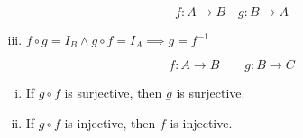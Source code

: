 \begin{frame}{}
  \begin{theorem}[UD Theorem $16.8$]
    \[
      f: A \to B \quad g: B \to A
    \]

    \begin{enumerate}[(i)]
      \setcounter{enumi}{2}
      \item $f \circ g = I_B \land g \circ f = I_A \implies g = f^{-1}$
    \end{enumerate}
  \end{theorem}

  \pause
  \begin{center}
  \end{center}

  \pause
  \begin{theorem}[UD Theorem 16.8]
    \[
      f: A \to B \qquad g: B \to C
    \]

    \begin{enumerate}[(i)]
      \item If $g \circ f$ is surjective, then $g$ is surjective.
      \item If $g \circ f$ is injective, then $f$ is injective.
    \end{enumerate}
  \end{theorem}

  \pause
  \begin{center}
  \end{center}
\end{frame}
